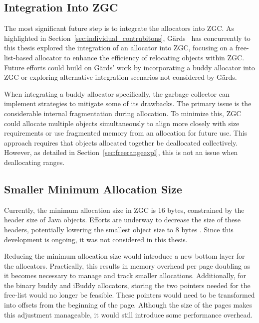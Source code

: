 \subsection{Integration Into ZGC} \label{sec:futureworkZ}

The most significant future step is to integrate the allocators into ZGC. As highlighted in Section~\ref{sec:individual_contrubitons}, Gärds~\cite{niclas} has concurrently to this thesis explored the integration of an allocator into ZGC, focusing on a free-list-based allocator to enhance the efficiency of relocating objects within ZGC. Future efforts could build on Gärds' work by incorporating a buddy allocator into ZGC or exploring alternative integration scenarios not considered by Gärds.

When integrating a buddy allocator specifically, the garbage collector can implement strategies to mitigate some of its drawbacks. The primary issue is the considerable internal fragmentation during allocation. To minimize this, ZGC could allocate multiple objects simultaneously to align more closely with size requirements or use fragmented memory from an allocation for future use. This approach requires that objects allocated together be deallocated collectively. However, as detailed in Section~\ref{sec:freerangeexpl}, this is not an issue when deallocating ranges.

\subsection{Smaller Minimum Allocation Size} \label{sec:futureworkLiliput}
Currently, the minimum allocation size in ZGC is 16 bytes, constrained by the header size of Java objects. Efforts are underway to decrease the size of these headers, potentially lowering the smallest object size to 8 bytes \cite{liliput}. Since this development is ongoing, it was not considered in this thesis.

Reducing the minimum allocation size would introduce a new bottom layer for the allocators. Practically, this results in memory overhead per page doubling as it becomes necessary to manage and track smaller allocations. Additionally, for the binary buddy and iBuddy allocators, storing the two pointers needed for the free-list would no longer be feasible. These pointers would need to be transformed into offsets from the beginning of the page. Although the size of the pages makes this adjustment manageable, it would still introduce some performance overhead.

